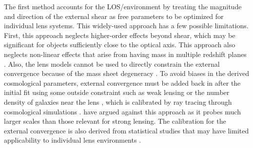 The first method accounts for the LOS/environment by treating the magnitude and direction of the external shear as free parameters to be optimized for individual lens systems. This widely-used approach has a few possible limitations. First, this approach neglects higher-order effects beyond shear, which may be significant for objects sufficiently close to the optical axis. This approach also neglects non-linear effects that arise from having mass in multiple redshift planes \citep[][]{McCully14,Jaroszynski12}. Also, the lens models cannot be used to directly constrain the external convergence because of the mass sheet degeneracy \citep{Falco85}.  To avoid biases in the derived cosmological parameters, external convergence must be added back in after the initial fit using some outside constraint such as weak lensing \citep{Nakajima09, Fadely10} or the number density of galaxies near the lens \citep{Suyu10, Suyu13, Collett13}, which is calibrated by ray tracing through cosmological simulations \citep[e.g.,][]{Hilbert09}. \citet{Schneider13} have argued against this approach as it probes much larger scales than those relevant for strong lensing. The calibration for the external convergence is also derived from statistical studies that may have limited applicability to individual lens environments \citep{Wong11}.
  